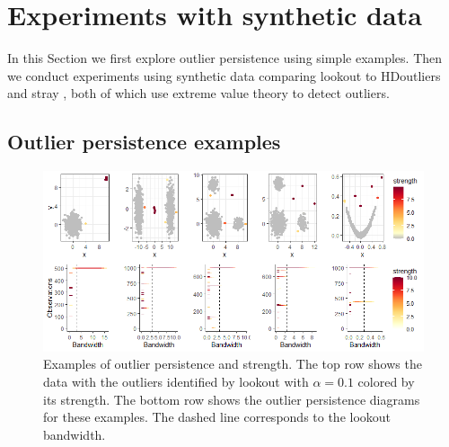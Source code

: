 \documentclass[letter,12pt]{article}
\begin{document}
\section{Experiments with synthetic data}\label{sec:simulations}
In this Section we first explore outlier persistence using simple examples. %
Then we conduct experiments using synthetic data comparing lookout to HDoutliers \citep{wilkinson2017visualizing} and stray \citep{pridiltal}, both of which use extreme value theory to detect outliers. 

\subsection{Outlier persistence examples}\label{sec:PersistenceExamples}
\begin{figure}[!ht]
    \centering
    \includegraphics[scale=0.7]{Graphics/Persistence_Ex1.png}
    \caption{Examples of outlier persistence and strength. The top row shows the data with the outliers identified by lookout with $\alpha = 0.1$ colored by its strength. The bottom row shows the outlier persistence diagrams for these examples. The dashed line corresponds to the lookout bandwidth. }
    \label{fig:persistenceExamples}
\end{figure}
\end{document}
